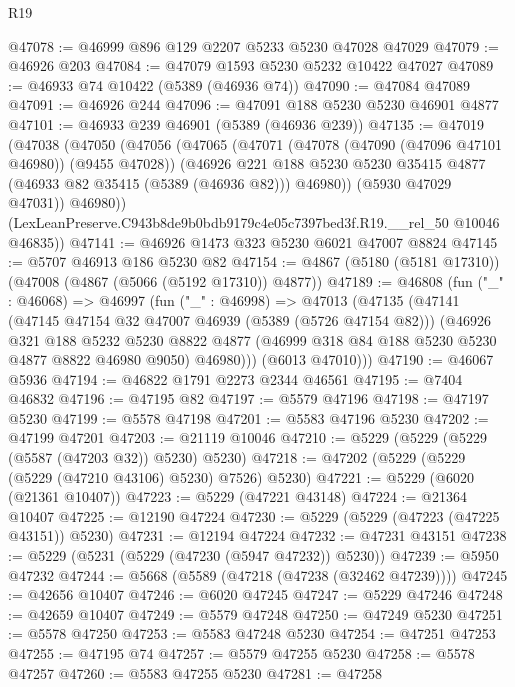 \begin{lexlean}{R19}
\begin{coremodule}
@47078 := @46999 @896 @129 @2207 @5233 @5230 @47028 @47029
@47079 := @46926 @203
@47084 := @47079 @1593 @5230 @5232 @10422 @47027
@47089 := @46933 @74 @10422 (@5389 (@46936 @74))
@47090 := @47084 @47089
@47091 := @46926 @244
@47096 := @47091 @188 @5230 @5230 @46901 @4877
@47101 := @46933 @239 @46901 (@5389 (@46936 @239))
@47135 := @47019
    (@47038
      (@47050
        (@47056
          (@47065
            (@47071
              (@47078 (@47090 (@47096 @47101 @46980)) (@9455 @47028))
              (@46926
                @221
                @188
                @5230
                @5230
                @35415
                @4877
                (@46933 @82 @35415 (@5389 (@46936 @82)))
                @46980))
            (@5930 @47029 @47031))
          @46980))
      (LexLeanPreserve.C943b8de9b0bdb9179c4e05c7397bed3f.R19.__rel_50 @10046 @46835))
@47141 := @46926 @1473 @323 @5230 @6021 @47007 @8824
@47145 := @5707 @46913 @186 @5230 @82
@47154 := @4867 (@5180 (@5181 @17310)) (@47008 (@4867 (@5066 (@5192 @17310)) @4877))
@47189 := @46808
    (fun ("_" : @46068) =>
    @46997
      (fun ("_" : @46998) =>
      @47013
        (@47135
          (@47141
            (@47145 @47154 @32 @47007 @46939 (@5389 (@5726 @47154 @82)))
            (@46926
              @321
              @188
              @5232
              @5230
              @8822
              @4877
              (@46999 @318 @84 @188 @5230 @5230 @4877 @8822 @46980 @9050)
              @46980)))
        (@6013 @47010)))
@47190 := @46067 @5936
@47194 := @46822 @1791 @2273 @2344 @46561
@47195 := @7404 @46832
@47196 := @47195 @82
@47197 := @5579 @47196
@47198 := @47197 @5230
@47199 := @5578 @47198
@47201 := @5583 @47196 @5230
@47202 := @47199 @47201
@47203 := @21119 @10046
@47210 := @5229 (@5229 (@5229 (@5587 (@47203 @32)) @5230) @5230)
@47218 := @47202 (@5229 (@5229 (@5229 (@47210 @43106) @5230) @7526) @5230)
@47221 := @5229 (@6020 (@21361 @10407))
@47223 := @5229 (@47221 @43148)
@47224 := @21364 @10407
@47225 := @12190 @47224
@47230 := @5229 (@5229 (@47223 (@47225 @43151)) @5230)
@47231 := @12194 @47224
@47232 := @47231 @43151
@47238 := @5229 (@5231 (@5229 (@47230 (@5947 @47232)) @5230))
@47239 := @5950 @47232
@47244 := @5668 (@5589 (@47218 (@47238 (@32462 @47239))))
@47245 := @42656 @10407
@47246 := @6020 @47245
@47247 := @5229 @47246
@47248 := @42659 @10407
@47249 := @5579 @47248
@47250 := @47249 @5230
@47251 := @5578 @47250
@47253 := @5583 @47248 @5230
@47254 := @47251 @47253
@47255 := @47195 @74
@47257 := @5579 @47255 @5230
@47258 := @5578 @47257
@47260 := @5583 @47255 @5230
@47281 := @47258

\end{coremodule}
\end{lexlean}
